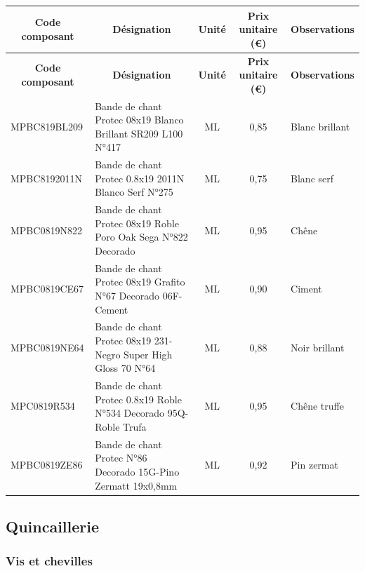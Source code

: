\documentclass[12pt,a4paper]{article}
\begin{document}
\begin{longtable}{|p{4cm}|p{7cm}|c|c|p{2cm}|}
\hline
\multicolumn{1}{|c|}{\textbf{Code composant}} & \multicolumn{1}{c|}{\textbf{Désignation}} & \multicolumn{1}{c|}{\textbf{Unité}} & \multicolumn{1}{c|}{\textbf{Prix unitaire (€)}} & \multicolumn{1}{c|}{\textbf{Observations}} \\
\hline
\endfirsthead
\hline
\multicolumn{1}{|c|}{\textbf{Code composant}} & \multicolumn{1}{c|}{\textbf{Désignation}} & \multicolumn{1}{c|}{\textbf{Unité}} & \multicolumn{1}{c|}{\textbf{Prix unitaire (€)}} & \multicolumn{1}{c|}{\textbf{Observations}} \\
\hline
\endhead
\hline
\endfoot
MPBC819BL209 & Bande de chant Protec 08x19 Blanco Brillant SR209 L100 N°417 & ML & 0,85 & Blanc brillant \\
MPBC8192011N & Bande de chant Protec 0.8x19 2011N Blanco Serf N°275 & ML & 0,75 & Blanc serf \\
MPBC0819N822 & Bande de chant Protec 08x19 Roble Poro Oak Sega N°822 Decorado & ML & 0,95 & Chêne \\
MPBC0819CE67 & Bande de chant Protec 08x19 Grafito N°67 Decorado 06F-Cement & ML & 0,90 & Ciment \\
MPBC0819NE64 & Bande de chant Protec 08x19 231-Negro Super High Gloss 70 N°64 & ML & 0,88 & Noir brillant \\
MPC0819R534 & Bande de chant Protec 0.8x19 Roble N°534 Decorado 95Q-Roble Trufa & ML & 0,95 & Chêne truffe \\
MPBC0819ZE86 & Bande de chant Protec N°86 Decorado 15G-Pino Zermatt 19x0,8mm & ML & 0,92 & Pin zermat \\
\hline
\end{longtable}

\subsection{Quincaillerie}

\subsubsection{Vis et chevilles}
\end{document}
